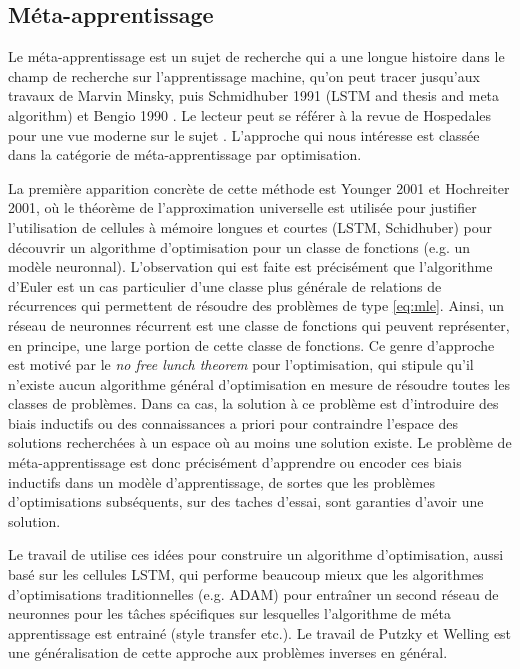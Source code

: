 \subsection{Méta-apprentissage}
Le méta-apprentissage est un sujet de recherche qui a une longue histoire dans le champ de recherche sur l'apprentissage machine, qu'on peut 
tracer jusqu'aux travaux de Marvin Minsky, puis Schmidhuber 1991 (LSTM and thesis and meta algorithm) et Bengio 1990 \citep{}. 
Le lecteur peut se référer à la revue de Hospedales pour une vue moderne sur le sujet \citep{}. L'approche qui nous intéresse est classée 
dans la catégorie de méta-apprentissage par optimisation.

La première apparition concrète de cette méthode est Younger 2001 et Hochreiter 2001, où le théorème de l'approximation universelle est utilisée pour 
justifier l'utilisation de cellules à mémoire longues et courtes (LSTM, Schidhuber) pour découvrir un algorithme d'optimisation pour un classe 
de fonctions (e.g. un modèle neuronnal). L'observation qui est faite est précisément que l'algorithme d'Euler est un cas particulier d'une 
classe plus générale de relations de récurrences qui permettent de résoudre des problèmes de type \eqref{eq:mle}. Ainsi, un réseau de neuronnes 
récurrent est une classe de fonctions qui peuvent représenter, en principe, une large portion de cette classe de fonctions. 
Ce genre d'approche est motivé par le \textit{no free lunch theorem} pour l'optimisation, qui stipule qu'il 
n'existe aucun algorithme général d'optimisation en mesure de résoudre toutes les classes de problèmes. Dans ca cas, la solution à ce problème est 
d'introduire des biais inductifs ou des connaissances a priori pour contraindre l'espace des solutions recherchées à un espace où au moins une solution existe. 
Le problème de méta-apprentissage est donc précisément d'apprendre ou encoder ces biais inductifs dans un modèle d'apprentissage, 
de sortes que les problèmes d'optimisations subséquents, sur des taches d'essai, sont garanties d'avoir une solution.

Le travail de \citet{Andrychowicz2016} utilise ces idées pour construire un algorithme d'optimisation, aussi basé sur les cellules LSTM, qui performe 
beaucoup mieux que les algorithmes d'optimisations traditionnelles (e.g. ADAM) pour entraîner un second réseau de neuronnes pour les tâches spécifiques 
sur lesquelles l'algorithme de méta apprentissage est entrainé (style transfer etc.). Le travail de Putzky et Welling est une généralisation de cette approche 
aux problèmes inverses en général.

